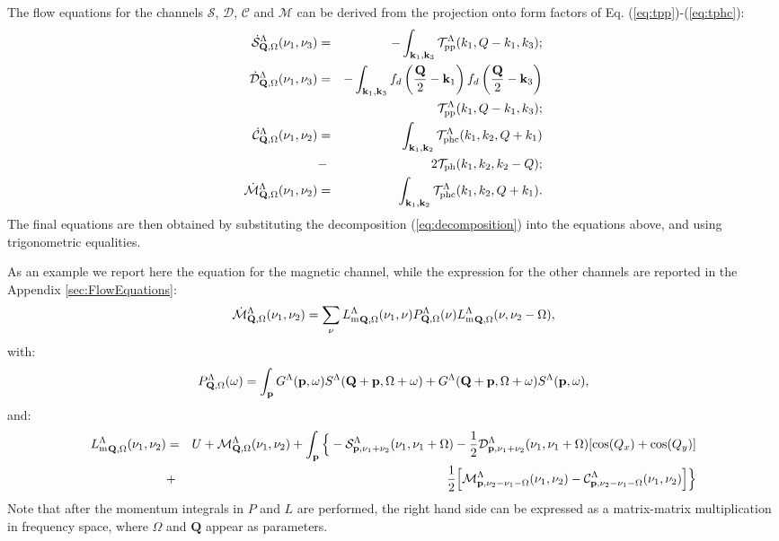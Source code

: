 The flow equations for the channels $\mathcal{S}$,  $\mathcal{D}$, $\mathcal{C}$ and $\mathcal{M}$ can be derived from the projection onto form factors of Eq. (\ref{eq:tpp})-(\ref{eq:tphc}):
\begin{eqnarray}
\dot{\mathcal{S}}_{\mathbf{Q},\Omega}^{\Lambda}(\nu_1,\nu_3)  &=& - \int _{\mathbf{k}_1, \mathbf{k}_3 } \mathcal{T}^\Lambda_{\mathrm{pp}}(k_1,Q-k_1,k_3); \\ 
\dot{\mathcal{D}}_{\mathbf{Q},\Omega}^{\Lambda}(\nu_1,\nu_3)  &=& -
\int _{\mathbf{k}_1,\mathbf{k}_3}  f_d\left( {\frac{\mathbf{Q}}{2} - \mathbf{k}_1} \right ) f_d\left ({\frac{\mathbf{Q}}{2} - \mathbf{k}_3} \right)  \nonumber \\ 
 &&\mathcal{T}^\Lambda_{\mathrm{pp}}(k_1,Q-k_1,k_3) ; 
\\
\nonumber
\dot{\mathcal{C}}_{\mathbf{Q},\Omega}^{\Lambda}(\nu_1,\nu_2) &=& 
\int _{\mathbf{k}_1,\mathbf{k}_2}   \mathcal{T}^\Lambda_{\mathrm{phc}}(k_1,k_2,Q+k_1)\\ &-&2\mathcal{T}_{\mathrm{ph}}(k_1,k_2,k_2-Q) ; 
\\ 
\dot{\mathcal{M}}_{\mathbf{Q},\Omega}^{\Lambda}(\nu_1,\nu_2) & =& 
\int _{\mathbf{k}_1,\mathbf{k}_2}  \mathcal{T}^\Lambda_{\mathrm{phc}}(k_1,k_2,Q+k_1). 
\end{eqnarray}
The final equations are then obtained by substituting the decomposition (\ref{eq:decomposition}) into the equations above, and using trigonometric equalities.
\begin{widetext}
As an example we report here the equation for the magnetic channel, while the expression for the other channels are reported in the Appendix \ref{sec:FlowEquations}: 
\begin{equation}
\dot{\mathcal{M}}^{\Lambda}_{\mathbf{Q},\Omega}(\nu_1,\nu_2) = 
\sum_\nu
{L_\mathrm{m}^\Lambda}_{\mathbf{Q},\Omega}(\nu_1,\nu) 
P_{\mathbf{Q},\Omega}^{\Lambda}(\nu) 
{L_\mathrm{m}^{\Lambda}}_{\mathbf{Q},\Omega}( \nu,\nu_2-\Omega), 
\end{equation} 	   
with: 
\begin{equation}
P_{\mathbf{Q},\Omega}^{\Lambda}(\omega) = \int_{\mathbf{p}}  G^\Lambda(\mathbf{p},\omega)S^\Lambda(\mathbf{Q}+\mathbf{p},\Omega+\omega) +G^\Lambda(\mathbf{Q}+\mathbf{p},\Omega+\omega)
S^\Lambda(\mathbf{p},\omega), 
\end{equation} 
and: 
\begin{eqnarray} 
\nonumber
{L_{\mathrm{m}}^\Lambda}_{\mathbf{Q},\Omega}(\nu_1,\nu_2)
&=&
U+\mathcal{M}^\Lambda_{\mathbf{Q},\Omega}(\nu_1,\nu_2) 
+ \int_{\mathbf{p}} \Big \{- \mathcal{S}^\Lambda_{\mathbf{p},\nu_1+\nu_2}(\nu_1,\nu_1+\Omega)  
-\frac{1}{2} 
\mathcal{D}^\Lambda_{\mathbf{p},\nu_1+\nu_2}(\nu_1,\nu_1+\Omega)
[\cos(Q_x)+\cos(Q_y)]  
\\
&+&\frac{1}{2} \Big[  \mathcal{M}^\Lambda_{\mathbf{p},\nu_2-\nu_1-\Omega}( \nu_1,\nu_2) 
- \mathcal{C}^\Lambda_{\mathbf{p},\nu_2-\nu_1-\Omega}(\nu_1,\nu_2) \Big] 
\Big \} 
\end{eqnarray}	 
Note that after the momentum integrals in $P$ and $L$ are performed, the right hand side can be expressed as a matrix-matrix multiplication in frequency space, where $\Omega$ and $\mathbf{Q}$ appear as parameters.
\end{widetext}

